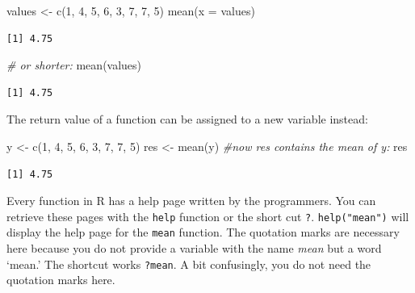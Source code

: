 \documentclass[
]{book}
\newenvironment{Shaded}{\begin{snugshade}}{\end{snugshade}}
\newcommand{\AttributeTok}[1]{\textcolor[rgb]{0.77,0.63,0.00}{#1}}
\newcommand{\CommentTok}[1]{\textcolor[rgb]{0.56,0.35,0.01}{\textit{#1}}}
\newcommand{\DecValTok}[1]{\textcolor[rgb]{0.00,0.00,0.81}{#1}}
\newcommand{\FunctionTok}[1]{\textcolor[rgb]{0.00,0.00,0.00}{#1}}
\newcommand{\NormalTok}[1]{#1}
\newcommand{\OtherTok}[1]{\textcolor[rgb]{0.56,0.35,0.01}{#1}}
\begin{document}
\begin{Shaded}
\begin{Highlighting}[]
\NormalTok{values }\OtherTok{\textless{}{-}} \FunctionTok{c}\NormalTok{(}\DecValTok{1}\NormalTok{, }\DecValTok{4}\NormalTok{, }\DecValTok{5}\NormalTok{, }\DecValTok{6}\NormalTok{, }\DecValTok{3}\NormalTok{, }\DecValTok{7}\NormalTok{, }\DecValTok{7}\NormalTok{, }\DecValTok{5}\NormalTok{)}
\FunctionTok{mean}\NormalTok{(}\AttributeTok{x =}\NormalTok{ values)}
\end{Highlighting}
\end{Shaded}

\begin{verbatim}
[1] 4.75
\end{verbatim}

\begin{Shaded}
\begin{Highlighting}[]
\CommentTok{\# or shorter:}
\FunctionTok{mean}\NormalTok{(values)}
\end{Highlighting}
\end{Shaded}

\begin{verbatim}
[1] 4.75
\end{verbatim}

The return value of a function can be assigned to a new variable instead:

\begin{Shaded}
\begin{Highlighting}[]
\NormalTok{y }\OtherTok{\textless{}{-}} \FunctionTok{c}\NormalTok{(}\DecValTok{1}\NormalTok{, }\DecValTok{4}\NormalTok{, }\DecValTok{5}\NormalTok{, }\DecValTok{6}\NormalTok{, }\DecValTok{3}\NormalTok{, }\DecValTok{7}\NormalTok{, }\DecValTok{7}\NormalTok{, }\DecValTok{5}\NormalTok{)}
\NormalTok{res }\OtherTok{\textless{}{-}} \FunctionTok{mean}\NormalTok{(y)}
\CommentTok{\#now res contains the mean of y:}
\NormalTok{res}
\end{Highlighting}
\end{Shaded}

\begin{verbatim}
[1] 4.75
\end{verbatim}

Every function in R has a help page written by the programmers. You can retrieve these pages with the \texttt{help} function or the short cut \texttt{?}. \texttt{help("mean")} will display the help page for the \texttt{mean} function. The quotation marks are necessary here because you do not provide a variable with the name \emph{mean} but a word `mean.' The shortcut works \texttt{?mean}. A bit confusingly, you do not need the quotation marks here.
\end{document}
